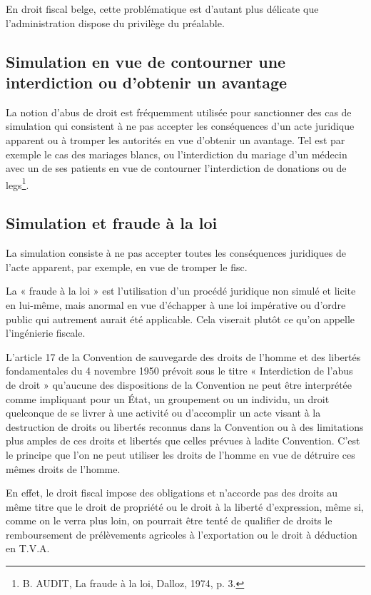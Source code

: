 \documentclass[12pt]{report}
\begin{document}
En droit fiscal belge, cette problématique est d’autant plus délicate que l’administration dispose du privilège du préalable.

\subsection{Simulation en vue de contourner une interdiction ou d’obtenir un avantage}
La notion d’abus de droit est fréquemment utilisée pour sanctionner des cas de simulation qui consistent à ne pas accepter les conséquences d’un acte juridique apparent ou à tromper les autorités en vue d’obtenir un avantage. Tel est par exemple le cas des mariages blancs, ou l’interdiction du mariage d’un médecin avec un de ses patients en vue de contourner l’interdiction de donations ou de legs\footnote{B. AUDIT, La fraude à la loi, Dalloz, 1974, p. 3.}.

\subsection{Simulation et fraude à la loi}
La simulation consiste à ne pas accepter toutes les conséquences juridiques de l’acte apparent, par exemple, en vue de tromper le fisc.

La « fraude à la loi » est l’utilisation d’un procédé juridique non simulé et licite en lui-même, mais anormal en vue d’échapper à une loi impérative ou d’ordre public qui autrement aurait été applicable. Cela viserait plutôt ce qu’on appelle l’ingénierie fiscale.

L’article 17 de la Convention de sauvegarde des droits de l’homme et des libertés fondamentales du 4 novembre 1950 prévoit sous le titre « Interdiction de l’abus de droit » qu’aucune des dispositions de la Convention ne peut être interprétée comme impliquant pour un État, un groupement ou un individu, un droit quelconque de se livrer à une activité ou d’accomplir un acte visant à la destruction de droits ou libertés reconnus dans la Convention ou à des limitations plus amples de ces droits et libertés que celles prévues à ladite Convention. C’est le principe que l’on ne peut utiliser les droits de l’homme en vue de détruire ces mêmes droits de l’homme.

En effet, le droit fiscal impose des obligations et n’accorde pas des droits au même titre que le droit de propriété ou le droit à la liberté d’expression, même si, comme on le verra plus loin, on pourrait être tenté de qualifier de droits le remboursement de prélèvements agricoles à l’exportation ou le droit à déduction en T.V.A.
\end{document}
